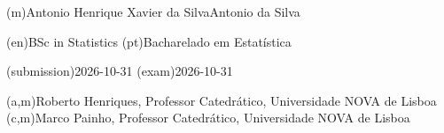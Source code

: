 \ntauthorname(m){Antonio Henrique Xavier da Silva}{Antonio da Silva}

\ntauthordegree(en){BSc in Statistics}
\ntauthordegree(pt){Bacharelado em Estatística}

\ntdate(submission){2026-10-31}
\ntdate(exam){2026-10-31}

(a,m){Roberto Henriques, Professor Catedrático, Universidade NOVA de Lisboa}
(c,m){Marco Painho, Professor Catedrático, Universidade NOVA de Lisboa}

